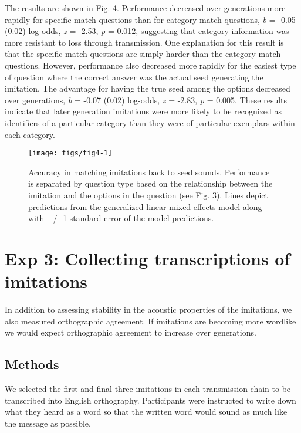 \documentclass[10pt,letterpaper]{article}
\begin{document}
The results are shown in Fig. 4. Performance decreased over generations
more rapidly for specific match questions than for category match
questions, \emph{b} = -0.05 (0.02) log-odds, \emph{z} = -2.53, \emph{p}
= 0.012, suggesting that category information was more resistant to loss
through transmission. One explanation for this result is that the
specific match questions are simply harder than the category match
questions. However, performance also decreased more rapidly for the
easiest type of question where the correct answer was the actual seed
generating the imitation. The advantage for having the true seed among
the options decreased over generations, \emph{b} = -0.07 (0.02)
log-odds, \emph{z} = -2.83, \emph{p} = 0.005. These results indicate
that later generation imitations were more likely to be recognized as
identifiers of a particular category than they were of particular
exemplars within each category.

\begin{figure}
\texttt{[image: figs/fig4-1]} \caption{Accuracy in matching imitations back to seed sounds. Performance is separated by question type based on the relationship between the imitation and the options in the question (see Fig. 3). Lines depict predictions from the generalized linear mixed effects model along with +/- 1 standard error of the model predictions.}\label{fig:fig4}
\end{figure}

\section{Exp 3: Collecting transcriptions of
imitations}\label{exp-3-collecting-transcriptions-of-imitations}

In addition to assessing stability in the acoustic properties of the
imitations, we also measured orthographic agreement. If imitations are
becoming more wordlike we would expect orthographic agreement to
increase over generations.

\subsection{Methods}\label{methods-2}

We selected the first and final three imitations in each transmission
chain to be transcribed into English orthography. Participants were
instructed to write down what they heard as a word so that the written
word would sound as much like the message as possible.
\end{document}
